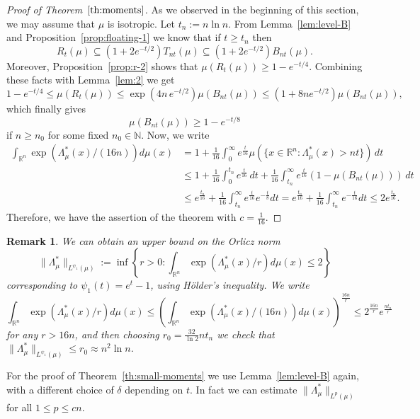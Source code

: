 \documentclass[11pt,leqno]{article}
\newtheorem{remark}[theorem]{Remark}
\theoremstyle{definition}
\theoremstyle{remark}
\numberwithin{equation}{section}
\newcommand{\ls}{\leqslant}
\newcommand{\gr}{\geqslant}
\newcommand{\1}{\textbf{1}}
\begin{document}
\begin{proof}[Proof of Theorem~$\ref{th:moments}$]As we observed in the beginning of this section,
we may assume that $\mu$ is isotropic. Let $t_n:=n\ln n$. From Lemma~\ref{lem:level-B} and Proposition~\ref{prop:floating-1} we know that
if $t\gr t_n$ then
$$R_t(\mu)\subseteq (1+2e^{-t/2})T_{nt}(\mu)\subseteq (1+2e^{-t/2})B_{nt}(\mu).$$
Moreover, Proposition~\ref{prop:r-2} shows that $\mu(R_t(\mu ))\gr 1-e^{-t/4}$. Combining these facts
with Lemma~\ref{lem:2} we get
$$1-e^{-t/4}\ls \mu(R_t(\mu)) \ls \exp\left(4n\,e^{-t/2}\right)\mu(B_{nt}(\mu))\ls (1+8ne^{-t/2})\mu(B_{nt}(\mu)),$$
which finally gives
$$\mu(B_{nt}(\mu))\gr 1-e^{-t/8}$$
if $n\gr n_0$ for some fixed $n_0\in\mathbb{N}$. Now, we write
\begin{align*}\int_{\mathbb{R}^n}\exp\left(\Lambda_{\mu}^{\ast}(x)/(16n)\right)d\mu(x)
&=1+\frac{1}{16}\int_0^{\infty}e^{\frac{t}{16}}\mu(\{x\in {\mathbb R}^n:\Lambda_{\mu}^{\ast}(x)>nt\})\,dt\\
&\ls 1+\frac{1}{16}\int_0^{t_n}e^{\frac{t}{16}}\,dt
+\frac{1}{16}\int_{t_n}^{\infty}e^{\frac{t}{16}}(1-\mu(B_{nt}(\mu)))\,dt\\
&\ls e^{\frac{t_n}{16}}+\frac{1}{16}\int_{t_n}^{\infty}e^{\frac{t}{16}}e^{-\frac{t}{8}}dt
=e^{\frac{t_n}{16}}+\frac{1}{16}\int_{t_n}^{\infty}e^{-\frac{t}{16}}dt \ls 2e^{\frac{t_n}{16}}.
\end{align*}
Therefore, we have the assertion of the theorem with $c=\frac{1}{16}$.\end{proof}

\begin{remark}\rm We can obtain an upper bound on the Orlicz norm
$$\|\Lambda_{\mu}^{\ast}\|_{L^{\psi_1}(\mu)}:=\inf\left\{r>0: \int_{\mathbb{R}^n}\exp\left(\Lambda_{\mu}^{\ast}(x)/r\right)d\mu(x)\ls 2\right\}$$
corresponding to $\psi_1(t)=e^t-1$, using H\"{o}lder's inequality. We write
$$\int_{\mathbb{R}^n}\exp\left(\Lambda_{\mu}^{\ast}(x)/r\right)d\mu(x)\ls \left(\int_{\mathbb{R}^n}\exp\left(\Lambda_{\mu}^{\ast}(x)/(16n)\right)d\mu(x)\right)^{\frac{16n}{r}}
\ls 2^{\frac{16n}{r}}e^{\frac{nt_n}{r}}$$
for any $r>16n$, and then choosing $r_0=\frac{32}{\ln 2}nt_n$ we check that $\|\Lambda_{\mu}^{\ast}\|_{L^{\psi_1}(\mu)}\ls r_0\approx n^2\ln n$.   
\end{remark}

For the proof of Theorem~\ref{th:small-moments} we use Lemma~\ref{lem:level-B} again, with a different
choice of $\delta$ depending on $t$. In fact we can estimate $\|\Lambda_{\mu}^{\ast}\|_{L^p(\mu)}$ for all $1\ls p\ls cn$.
\end{document}
